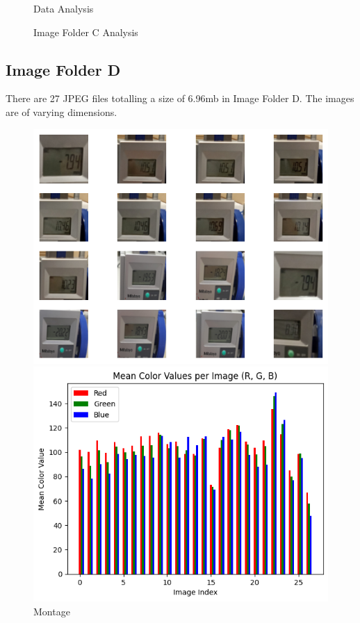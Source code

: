 \begin{figure}[ht]
\begin{minipage}[t]{0.50\textwidth}
        \caption*{Data Analysis}
    \end{minipage}
    \caption{Image Folder C Analysis}
    \label{fig:Image Folder C Analysis}
\end{figure}


\subsection{Image Folder D}

There are 27 JPEG files totalling a size of 6.96mb in Image Folder D. The images are of varying dimensions.

\begin{figure}[ht]
    \centering
    \begin{minipage}[t]{0.25\textwidth}
        \centering
        \includegraphics[width=\textwidth]{Figures/EDA_Charts/5/montage.png}
        \caption*{Montage}
    \end{minipage}\hfill
    \begin{minipage}[t]{0.25\textwidth}
        \centering
        \includegraphics[width=\textwidth]{Figures/EDA_Charts/5/rgb.png}

\end{minipage}
\end{figure}
